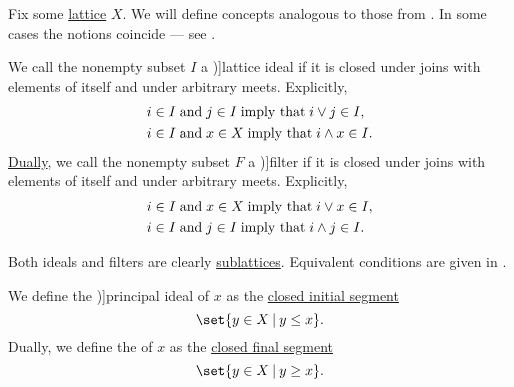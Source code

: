 \begin{definition}\label{def:lattice_ideal}
  Fix some \hyperref[def:lattice]{lattice} \( X \). We will define concepts analogous to those from . In some cases the notions coincide --- see .

  \begin{TwoColumns}
    We call the nonempty subset \( I \) a \term[ru=решёточный идеал (\cite[def. 4.5]{Гуров2013})]{lattice ideal} if it is closed under joins with elements of itself and under arbitrary meets. Explicitly,
    \begin{subequations}
      \begin{align}
        &i \in I \T{and} j \in I \T{imply that} i \vee j \in I, \label{eq:def:lattice_ideal/lattice_join} \\
        &i \in I \T{and} x \in X \T{imply that} i \wedge x \in I. \label{eq:def:lattice_ideal/lattice_meet}
      \end{align}
    \end{subequations}
  \BeginSecondColumn
    \hyperref[thm:lattice_duality]{Dually}, we call the nonempty subset \( F \) a \term[ru=решёточный фильтр (\cite[def. 4.5]{Гуров2013})]{filter} if it is closed under joins with elements of itself and under arbitrary meets. Explicitly,
    \begin{subequations}
      \begin{align}
        &i \in I \T{and} x \in X \T{imply that} i \vee x \in I, \label{eq:def:lattice_ideal/filter_join} \\
        &i \in I \T{and} j \in I \T{imply that} i \wedge j \in I. \label{eq:def:lattice_ideal/filter_meet}
      \end{align}
    \end{subequations}
  \end{TwoColumns}

  Both ideals and filters are clearly \hyperref[def:lattice/submodel]{sublattices}. Equivalent conditions are given in .

  \begin{thmenum}
    \begin{TwoColumns*}
      We define the \term[ru=главный (идеал) (\cite[140]{Гуров2013})]{principal ideal} of \( x \) as the \hyperref[def:order_interval/unbounded]{closed initial segment}
      \begin{equation*}
        \set{ y \in X \given y \leq x }.
      \end{equation*}
    \BeginSecondColumn
      Dually, we define the  of \( x \) as the \hyperref[def:order_interval/unbounded]{closed final segment}
      \begin{equation*}
        \set{ y \in X \given y \geq x }.
      \end{equation*}
    \end{TwoColumns*}


\end{thmenum}
\end{definition}
